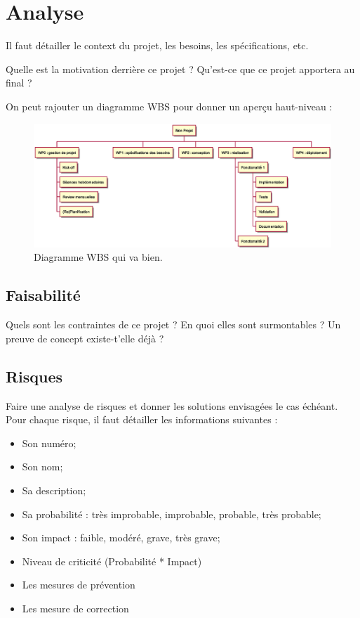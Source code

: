\chapter{Analyse}
Il faut détailler le context du projet, les besoins, les spécifications, etc.

Quelle est la motivation derrière ce projet ? Qu'est-ce que ce projet apportera au final ?

On peut rajouter un diagramme WBS pour donner un aperçu haut-niveau :
\begin{figure}[h]
    \centering
    \includegraphics[width=\textwidth]{./images/WBS_Exemple.eps}
    \caption{Diagramme WBS qui va bien.}
\end{figure}

\section{Faisabilité}
Quels sont les contraintes de ce projet ? En quoi elles sont surmontables ? Un preuve de concept existe-t'elle déjà ?

\section{Risques}
Faire une analyse de risques et donner les solutions envisagées le cas échéant.
Pour chaque risque, il faut détailler les informations suivantes :
\begin{itemize}
  \item Son numéro;
  \item Son nom;
  \item Sa description;
  \item Sa probabilité : très improbable, improbable, probable, très probable;
  \item Son impact :  faible, modéré, grave, très grave;
  \item Niveau de criticité (Probabilité * Impact)
  \item Les mesures de prévention
  \item Les mesure de correction
\end{itemize}

